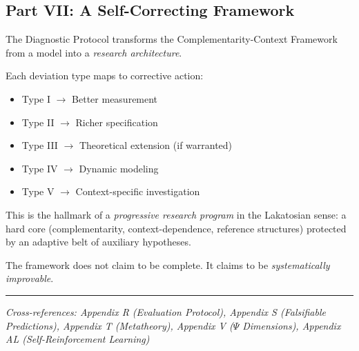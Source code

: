 \subsection{Part VII: A Self-Correcting Framework}

The Diagnostic Protocol transforms the Complementarity-Context Framework 
from a model into a \textit{research architecture}.

\begin{center}
\end{center}

Each deviation type maps to corrective action:
\begin{itemize}
    \item Type I $\rightarrow$ Better measurement
    \item Type II $\rightarrow$ Richer specification
    \item Type III $\rightarrow$ Theoretical extension (if warranted)
    \item Type IV $\rightarrow$ Dynamic modeling
    \item Type V $\rightarrow$ Context-specific investigation
\end{itemize}

This is the hallmark of a \textit{progressive research program} in the Lakatosian 
sense: a hard core (complementarity, context-dependence, reference structures) 
protected by an adaptive belt of auxiliary hypotheses.

The framework does not claim to be complete. It claims to be 
\textit{systematically improvable}.

\vspace{1em}
\hrule
\vspace{0.5em}
\noindent\textit{Cross-references: Appendix R (Evaluation Protocol), 
Appendix S (Falsifiable Predictions), Appendix T (Metatheory), 
Appendix V ($\Psi$ Dimensions), Appendix AL (Self-Reinforcement Learning)}

